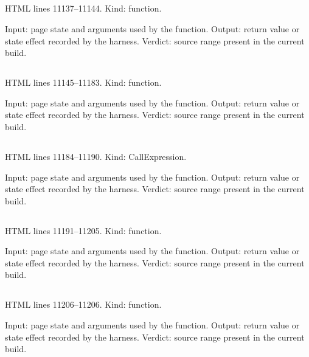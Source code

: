 \subsection*{\texttt{}}
\label{vf_607_selImageItems}
HTML lines 11137--11144. Kind: function.

Input: page state and arguments used by the function.
Output: return value or state effect recorded by the harness.
Verdict: source range present in the current build.

\subsection*{\texttt{}}
\label{vf_608_selDataItems}
HTML lines 11145--11183. Kind: function.

Input: page state and arguments used by the function.
Output: return value or state effect recorded by the harness.
Verdict: source range present in the current build.

\subsection*{\texttt{}}
\label{vf_609_SEL_OPTION_RULES}
HTML lines 11184--11190. Kind: CallExpression.

Input: page state and arguments used by the function.
Output: return value or state effect recorded by the harness.
Verdict: source range present in the current build.

\subsection*{\texttt{}}
\label{vf_610_selChartItems}
HTML lines 11191--11205. Kind: function.

Input: page state and arguments used by the function.
Output: return value or state effect recorded by the harness.
Verdict: source range present in the current build.

\subsection*{\texttt{}}
\label{vf_611_selCatalogue}
HTML lines 11206--11206. Kind: function.

Input: page state and arguments used by the function.
Output: return value or state effect recorded by the harness.
Verdict: source range present in the current build.

